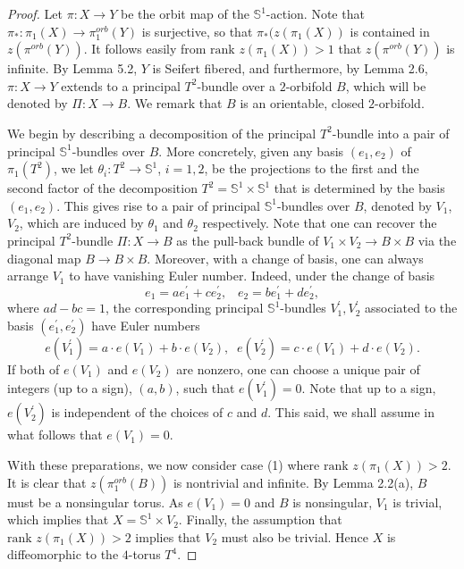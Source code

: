 \documentclass[11pt]{amsart}
\theoremstyle{plain}
\numberwithin{theorem}{section}
\theoremstyle{definition}
\begin{document}
\begin{proof}
Let $\pi:X\rightarrow Y$ be the orbit map of the ${{\mathbb S}}^1$-action. Note that 
$\pi_\ast:\pi_1(X)\rightarrow \pi_1^{orb}(Y)$ is surjective, so that $\pi_\ast (z(\pi_1(X))$
is contained in $z(\pi^{orb}(Y))$. It follows easily from $\text{rank }z(\pi_1(X))>1$
that $z(\pi^{orb}(Y))$ is infinite. By Lemma 5.2, $Y$ is Seifert fibered, and furthermore, 
by Lemma 2.6, $\pi: X\rightarrow Y$ extends to a principal $T^2$-bundle over a $2$-orbifold 
$B$, which will be denoted by $\Pi:X\rightarrow B$. We remark that $B$ is an orientable, 
closed $2$-orbifold.

We begin by describing a decomposition of the principal $T^2$-bundle into a pair of principal 
${{\mathbb S}}^1$-bundles over $B$.  More concretely, given any basis $(e_1,e_2)$ of $\pi_1(T^2)$, we 
let $\theta_i:T^2\rightarrow {{\mathbb S}}^1$, $i=1,2$, be the projections to the first and the second
factor of the decomposition $T^2={{\mathbb S}}^1\times {{\mathbb S}}^1$ that is determined by the basis $(e_1,e_2)$.
This gives rise to a pair of principal ${{\mathbb S}}^1$-bundles over $B$, denoted by $V_1$, $V_2$, which
are induced by $\theta_1$ and $\theta_2$ respectively. Note that one can recover the principal
$T^2$-bundle $\Pi: X\rightarrow B$ as the pull-back bundle of $V_1\times V_2\rightarrow B\times B$ 
via the diagonal map $B\rightarrow B\times B$. Moreover, with a change of basis,
one can always arrange $V_1$ to have vanishing Euler number. Indeed, under the change 
of basis
$$
e_1 =ae_1^\prime+ce_2^\prime,\;\;\; e_2=be_1^\prime+de_2^\prime, 
$$
where $ad-bc=1$, the corresponding principal ${{\mathbb S}}^1$-bundles $V_1^\prime, V_2^\prime$ 
associated to the basis $(e_1^\prime,e_2^\prime)$ have Euler numbers
$$
e(V_1^\prime)=a\cdot e(V_1)+b\cdot e(V_2), \;\; e(V_2^\prime)=c\cdot e(V_1)+d\cdot e(V_2). 
$$
If both of $e(V_1)$ and $e(V_2)$ are nonzero, one can choose a unique pair of integers
(up to a sign), $(a,b)$, such that $e(V_1^\prime)=0$. Note that up to a sign, $e(V_2^\prime)$ 
is independent of the choices of $c$ and $d$. This said, we shall assume in what follows that
$e(V_1)=0$.

With these preparations, we now consider case (1) where $\text{rank }z(\pi_1(X))>2$. 
It is clear that $z(\pi_1^{orb}(B))$ is nontrivial and infinite. By Lemma 2.2(a), $B$ must be a 
nonsingular torus. As $e(V_1)=0$ and $B$ is nonsingular, $V_1$ is trivial, which implies that 
$X={{\mathbb S}}^1\times V_2$. Finally, the assumption that $\text{rank }z(\pi_1(X))>2$ implies that $V_2$ 
must also be trivial. Hence $X$ is diffeomorphic to the $4$-torus $T^4$.


\end{proof}
\end{document}
